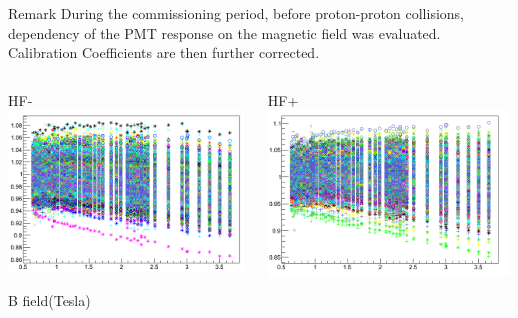 \documentclass[pdf, 9pt]{beamer}
\begin{document}
  \begin{frame}
    \begin{block}{Remark}
      During the commissioning period, before proton-proton collisions, dependency of the PMT response on the magnetic field was evaluated. Calibration Coefficients are then further corrected.
    \end{block}
    \begin{columns}[T]
      \begin{column}{0.5\textwidth}
        \begin{center}
          HF-\\
          \includegraphics[width=0.99\textwidth, height=0.4\textheight]{figs/hfbfield/HFM_SignalVSfield.png}
        \end{center}
        \begin{flushright}
          B field(Tesla)
        \end{flushright}
      \end{column}
      \begin{column}{0.5\textwidth}
        \begin{center}
          HF+\\
          \includegraphics[width=0.99\textwidth, height=0.4\textheight]{figs/hfbfield/HFP_SignalVSfield.png}

\end{center}
\end{column}
\end{columns}
\end{frame}
\end{document}
